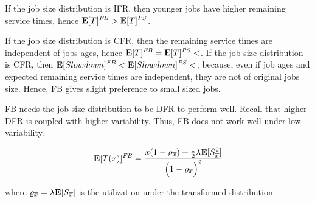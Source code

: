 If the job size distribution is IFR, then younger jobs have higher remaining service times, hence $\mathbf{E}[T]^{\mathit{FB}}>\mathbf{E}[T]^{\mathit{PS}}$.

If the job size distribution is CFR, then the remaining service times are independent of jobs ages, hence $\mathbf{E}[T]^{\mathit{FB}}=\mathbf{E}[T]^{\mathit{PS}}<$. 
If the job size distribution is CFR, then $\mathbf{E}[Slowdown]^{\mathit{FB}}<\mathbf{E}[Slowdown]^{\mathit{PS}}<$, because, even if job ages and expected remaining service times are independent, they are not of original jobs size. Hence, FB gives slight preference to small sized jobs.

FB needs the job size distribution to be DFR to perform well. Recall that higher DFR is coupled with higher variability. Thus, FB does not work well under low variability.

\begin{equation}
\label{eqn:Scheduling-FB-Response-Time}
\expected{T(x)}^{\mathit{FB}}=
\frac{x(1-\varrho_{\overline{x}})+\frac{1}{2}\lambda\expected{S_{\overline{x}}^{2}}}
{\Big(1-\varrho_{\overline{x}}\Big)^{2}}
\end{equation}

where $\varrho_{\overline{x}}=\lambda\mathbf{E}[S_{\overline{x}}]$ is the utilization under the transformed distribution.